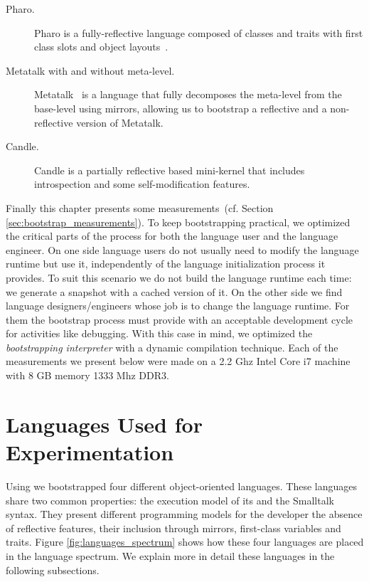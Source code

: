 \begin{description}
\item[Pharo.] Pharo is a fully-reflective language composed of classes and traits with first class slots and object layouts~\cite{Verw11a}.
\item[Metatalk with and without meta-level.] Metatalk~\cite{Papo11a} is a language that fully decomposes the meta-level from the base-level using mirrors, allowing us to bootstrap a reflective and a non-reflective version of Metatalk.
\item[Candle.] Candle is a partially reflective  based mini-kernel that includes introspection and some self-modification features.
\end{description}

Finally this chapter presents some measurements~(cf. Section \ref{sec:bootstrap_measurements}). To keep bootstrapping practical, we optimized the critical parts of the process for both the language user and the language engineer. On one side language users do not usually need to modify the language runtime but use it, independently of the language initialization process it provides. To suit this scenario we do not build the language runtime each time: we generate a snapshot with a cached version of it. On the other side we find language designers/engineers whose job is to change the language runtime. For them the bootstrap process must provide with an acceptable development cycle for activities like debugging. With this case in mind, we optimized the \emph{bootstrapping interpreter} with a dynamic compilation technique. Each of the measurements we present below were made on a 2.2 Ghz Intel Core i7 machine with 8 GB memory 1333 Mhz DDR3.

\section{Languages Used for Experimentation}\label{sec:bootstrap_case_studies}

Using \Vtt we bootstrapped four different object-oriented languages. These languages share two common properties: the execution model of its \VM and the Smalltalk syntax. They present different programming models for the developer \eg the absence of reflective features, their inclusion through mirrors, first-class variables and traits.
Figure \ref{fig:languages_spectrum} shows how these four languages are placed in the language spectrum. We explain more in detail these languages in the following subsections.%

